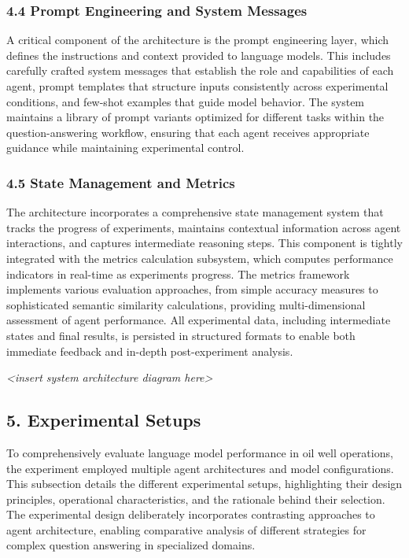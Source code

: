             \subsubsection{4.4 Prompt Engineering and System Messages}

            A critical component of the architecture is the prompt engineering layer, which defines the instructions and context provided to language models. This includes carefully crafted system messages that establish the role and capabilities of each agent, prompt templates that structure inputs consistently across experimental conditions, and few-shot examples that guide model behavior. The system maintains a library of prompt variants optimized for different tasks within the question-answering workflow, ensuring that each agent receives appropriate guidance while maintaining experimental control.

            \subsubsection{4.5 State Management and Metrics}

            The architecture incorporates a comprehensive state management system that tracks the progress of experiments, maintains contextual information across agent interactions, and captures intermediate reasoning steps. This component is tightly integrated with the metrics calculation subsystem, which computes performance indicators in real-time as experiments progress. The metrics framework implements various evaluation approaches, from simple accuracy measures to sophisticated semantic similarity calculations, providing multi-dimensional assessment of agent performance. All experimental data, including intermediate states and final results, is persisted in structured formats to enable both immediate feedback and in-depth post-experiment analysis.

            \textit{<insert system architecture diagram here>}

        \subsection{5. Experimental Setups}

            To comprehensively evaluate language model performance in oil well operations, the experiment employed multiple agent architectures and model configurations. This subsection details the different experimental setups, highlighting their design principles, operational characteristics, and the rationale behind their selection. The experimental design deliberately incorporates contrasting approaches to agent architecture, enabling comparative analysis of different strategies for complex question answering in specialized domains.

